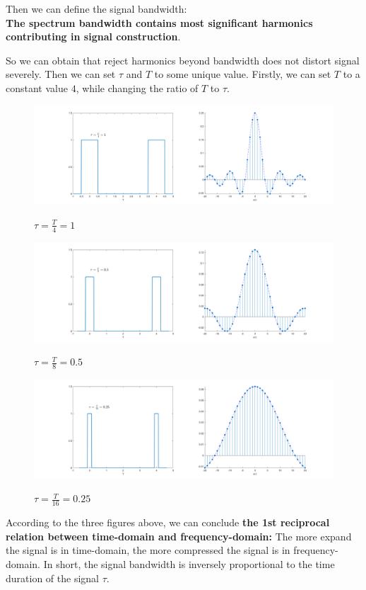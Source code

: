 \documentclass[margin,line]{res}
\begin{document}
\begin{resume}
Then we can define the signal bandwidth: \\
\textbf{The spectrum bandwidth contains most significant harmonics contributing in signal construction}. \par
So we can obtain that reject harmonics beyond bandwidth does not distort signal severely. Then we can set $\tau$ and $T$ to some unique value. Firstly, we can set $T$ to a constant value $4$, while changing the ratio of $T$ to $\tau$.
\begin{figure}[H]
	\centerline{\includegraphics[width=0.9\linewidth]{figure/bw_1.png}}
	\centerline{\textbf{$\tau = \frac{T}{4} = 1$}}
\end{figure}
\begin{figure}[H]
	\centerline{\includegraphics[width=0.9\linewidth]{figure/bw_2.png}}
	\centerline{\textbf{$\tau = \frac{T}{8} = 0.5$}}
\end{figure}
\begin{figure}[H]
	\centerline{\includegraphics[width=0.9\linewidth]{figure/bw_3.png}}
	\centerline{\textbf{$\tau = \frac{T}{16} = 0.25$}}
\end{figure}
According to the three figures above, we can conclude 
\textbf{the 1st reciprocal relation between time-domain and frequency-domain:} 
The more expand the signal is in time-domain, the more compressed the signal is in frequency-domain. In short, the signal bandwidth is inversely proportional to the time duration of the signal $\tau$.

\end{resume}
\end{document}
